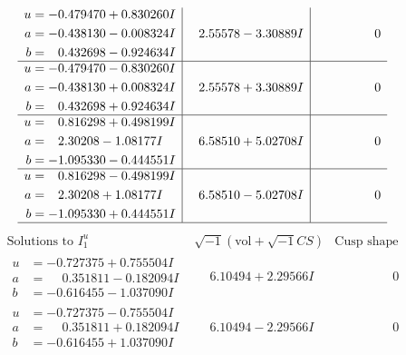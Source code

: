 \documentclass[1p]{elsarticle_modified}
\theoremstyle{definition}
\newcommand{\I}{\sqrt{-1}}
\begin{document}
$$\begin{array}{c|c|c}
\begin{aligned}
u &= -0.479470 + 0.830260 I \\
a &= -0.438130 - 0.008324 I \\
b &= \phantom{-}0.432698 - 0.924634 I\end{aligned}
 & \phantom{-}2.55578 - 3.30889 I & \phantom{-0.000000 } 0 \\ \hline\begin{aligned}
u &= -0.479470 - 0.830260 I \\
a &= -0.438130 + 0.008324 I \\
b &= \phantom{-}0.432698 + 0.924634 I\end{aligned}
 & \phantom{-}2.55578 + 3.30889 I & \phantom{-0.000000 } 0 \\ \hline\begin{aligned}
u &= \phantom{-}0.816298 + 0.498199 I \\
a &= \phantom{-}2.30208 - 1.08177 I \\
b &= -1.095330 - 0.444551 I\end{aligned}
 & \phantom{-}6.58510 + 5.02708 I & \phantom{-0.000000 } 0 \\ \hline\begin{aligned}
u &= \phantom{-}0.816298 - 0.498199 I \\
a &= \phantom{-}2.30208 + 1.08177 I \\
b &= -1.095330 + 0.444551 I\end{aligned}
 & \phantom{-}6.58510 - 5.02708 I & \phantom{-0.000000 } 0\\
 \hline 
 \end{array}$$\newpage$$\begin{array}{c|c|c}  
\text{Solutions to }I^u_{1}& \I (\text{vol} + \sqrt{-1}CS) & \text{Cusp shape}\\
 \hline 
\begin{aligned}
u &= -0.727375 + 0.755504 I \\
a &= \phantom{-}0.351811 - 0.182094 I \\
b &= -0.616455 - 1.037090 I\end{aligned}
 & \phantom{-}6.10494 + 2.29566 I & \phantom{-0.000000 } 0 \\ \hline\begin{aligned}
u &= -0.727375 - 0.755504 I \\
a &= \phantom{-}0.351811 + 0.182094 I \\
b &= -0.616455 + 1.037090 I\end{aligned}
 & \phantom{-}6.10494 - 2.29566 I & \phantom{-0.000000 } 0 \\ \hline\begin{aligned}

\end{aligned}
\end{array}$$
\end{document}
